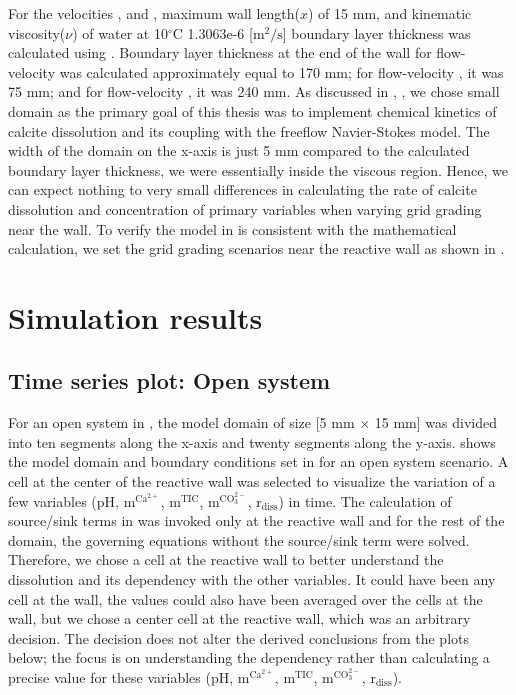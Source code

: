 For the velocities ,  and , maximum wall length($x$) of 15 mm, and kinematic viscosity($\nu$) of 
water at 10$^\circ$C 1.3063e-6 [$\mathrm{m^2/s}$] \cite{wagner2008iapws} boundary layer thickness was calculated using . 
Boundary layer thickness at the end of the wall for flow-velocity  was calculated approximately equal to 170 mm; 
for flow-velocity , it was 75 mm; and for flow-velocity , it was 240 mm. As discussed in 
, , we chose small domain as the primary goal of this thesis was to 
implement chemical kinetics of calcite dissolution and its coupling with the freeflow Navier-Stokes model. 
The width of the domain on the x-axis is just 5 mm compared to the calculated boundary layer thickness, we were essentially 
inside the viscous region. Hence, we can expect nothing to very small differences in calculating the rate of calcite dissolution and concentration 
of primary variables when varying grid grading near the wall. To verify the model in \DuMuX is 
consistent with the mathematical calculation, we set the grid grading scenarios near the reactive wall as shown in . \\

\section{\DuMuX Simulation results}

\subsection{Time series plot: Open system}\label{ssec:timeSeriesOpen}
For an open system in \DuMuX, the model domain of size [5 mm $\times$ 15 mm] was divided into ten segments along the x-axis and twenty segments along the y-axis. 
 shows the model domain and boundary conditions set in \DuMuX for an open system scenario. 
A cell at the center of the reactive wall was selected to visualize the variation of a few variables (pH, $\mathrm{m^{Ca^{2+}}}$, $\mathrm{m^{TIC}}$, 
$\mathrm{m^{CO_3^{2-}}}$, $\mathrm{r_{diss}}$) in time.  
The calculation of source/sink terms in \DuMuX was invoked only at the reactive wall and for the rest of 
the domain, the governing equations without the source/sink term were solved. \\
Therefore, we chose a cell at the reactive wall to better understand the dissolution
and its dependency with the other variables. It could have been any cell at the wall, the values could also have been averaged over the cells at the wall, but we 
chose a center cell at the reactive wall, which was an arbitrary decision. The decision does not alter the derived conclusions from the plots below; the focus is on 
understanding the dependency rather than calculating a precise value for these variables (pH, $\mathrm{m^{Ca^{2+}}}$, $\mathrm{m^{TIC}}$, 
$\mathrm{m^{CO_3^{2-}}}$, $\mathrm{r_{diss}}$).

